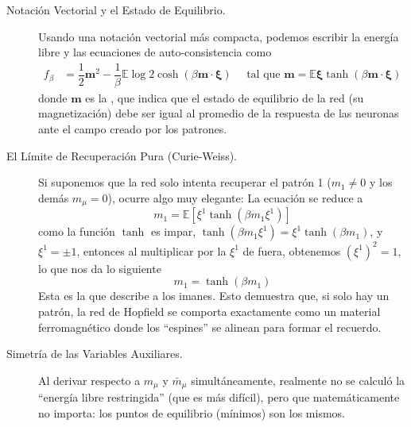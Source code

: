\begin{description}
    \item[Notación Vectorial y el Estado de Equilibrio.] Usando una notación vectorial más compacta, podemos escribir la energía libre y las ecuaciones de auto-consistencia como
    \begin{align*}
        f_{\beta} &= \dfrac{1}{2} \mathbf{m}^2 - \dfrac{1}{\beta} \mathbb{E} \log 2 \cosh(\beta \mathbf{m} \cdot \mathbf{\xi}) \quad \text{ tal que } \mathbf{m} = \mathbb{E} \mathbf{\xi} \tanh(\beta \mathbf{m} \cdot \mathbf{\xi})
    \end{align*}
    donde $\mathbf{m}$ es la , que indica que el estado de equilibrio de la red (su magnetización) debe ser igual al promedio de la respuesta de las neuronas ante el campo creado por los patrones.
    \item[El Límite de Recuperación Pura (Curie-Weiss).] Si suponemos que la red solo intenta recuperar el patrón 1 ($m_1 \neq 0$ y los demás $m_\mu = 0$), ocurre algo muy elegante: La ecuación se reduce a
    \begin{equation*}
        m_1 = \mathbb{E} [\xi^1 \tanh(\beta m_1 \xi^1)]
    \end{equation*}
    como la función $\tanh$ es impar, $\tanh(\beta m_1 \xi^1) = \xi^1 \tanh(\beta m_1)$, y $\xi^1 = \pm 1$, entonces al multiplicar por la $\xi^1$ de fuera, obtenemos $(\xi^1)^2 = 1$, lo que nos da lo siguiente
    \begin{equation*}
        m_1 = \tanh(\beta m_1)
    \end{equation*}
    Esta es la  que describe a los imanes. Esto demuestra que, si solo hay un patrón, la red de Hopfield se comporta exactamente como un material ferromagnético donde los ``espines'' se alinean para formar el recuerdo.
    \item[Simetría de las Variables Auxiliares.] Al derivar respecto a $m_\mu$ y $\bar{m}_\mu$ simultáneamente, realmente no se calculó la ``energía libre restringida'' (que es más difícil), pero que matemáticamente no importa: los puntos de equilibrio (mínimos) son los mismos.
\end{description}

